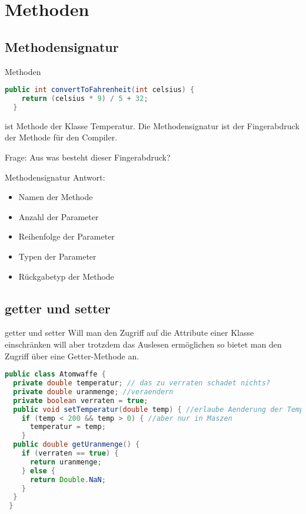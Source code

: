 \documentclass[18pt]{beamer}
\begin{document}
\section{Methoden}
\subsection{Methodensignatur}
\begin{frame}[fragile]{Methoden}
 \begin{lstlisting}[language=java]
  public int convertToFahrenheit(int celsius) {
    return (celsius * 9) / 5 + 32;
  }
 \end{lstlisting}
 ist Methode der Klasse Temperatur. Die Methodensignatur ist der Fingerabdruck der Methode für den Compiler.
 
 Frage: Aus was besteht dieser Fingerabdruck?
\end{frame}

\begin{frame}{Methodensignatur}
Antwort:
 \begin{itemize}
  \item Namen der Methode
  \item Anzahl der Parameter
  \item Reihenfolge der Parameter
  \item Typen der Parameter
  \item Rückgabetyp der Methode
 \end{itemize}

\end{frame}

\subsection{getter und setter}
\begin{frame}[fragile]{getter und setter}
Will man den Zugriff auf die Attribute einer Klasse einschränken will aber trotzdem das Auslesen ermöglichen so bietet man den Zugriff über eine Getter-Methode an.
\begin{lstlisting}[language=java]
 public class Atomwaffe {
  private double temperatur; // das zu verraten schadet nichts?
  private double uranmenge; //veraendern 
  private boolean verraten = true;
  public void setTemperatur(double temp) { //erlaube Aenderung der Temperatur
    if (temp < 200 && temp > 0) { //aber nur in Maszen
      temperatur = temp;
    }
  public double getUranmenge() {
    if (verraten == true) {
      return uranmenge;
    } else {
      return Double.NaN;
    }
  }
 }
\end{lstlisting}
\end{frame}
\end{document}

